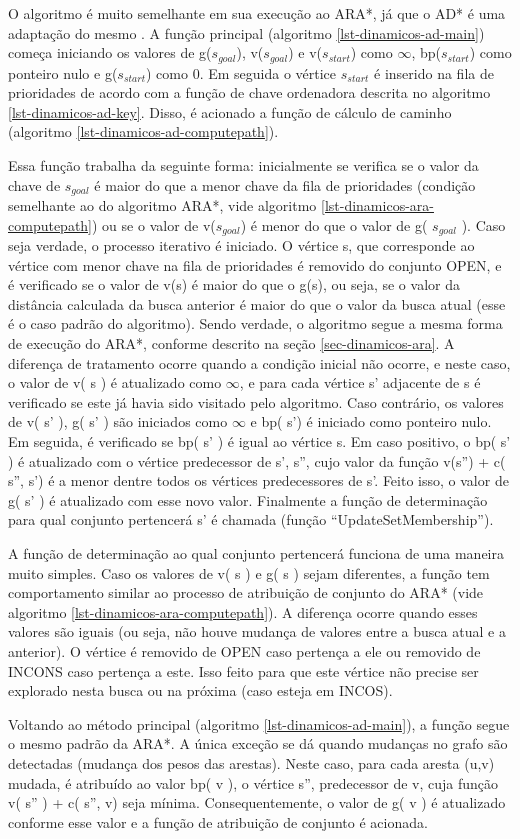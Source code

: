O algoritmo é muito semelhante em sua execução ao ARA*, já que o AD* é uma adaptação do mesmo \cite{moura2010estudo}. A função principal (algoritmo \ref{lst-dinamicos-ad-main}) começa iniciando os valores de g($s_{goal}$), v($s_{goal}$) e v($s_{start}$) como $\infty$, bp($s_{start}$) como ponteiro nulo e g($s_{start}$) como 0. Em seguida o vértice $s_{start}$ é inserido na fila de prioridades de acordo com  a função de chave ordenadora descrita no algoritmo \ref{lst-dinamicos-ad-key}. Disso, é acionado a função de cálculo de caminho (algoritmo \ref{lst-dinamicos-ad-computepath}).

Essa função trabalha da seguinte forma: inicialmente se verifica se o valor da chave de $s_{goal}$ é maior do que a menor chave da fila de prioridades (condição semelhante ao do algoritmo ARA*, vide algoritmo \ref{lst-dinamicos-ara-computepath}) ou se o valor de v($s_{goal}$) é menor do que o valor de g( $s_{goal}$ ). Caso seja verdade, o processo iterativo é iniciado. O vértice s, que corresponde ao vértice com menor chave na fila de prioridades é removido do conjunto OPEN, e é verificado se o valor de v(s) é maior do que o g(s), ou seja, se o valor da distância calculada da busca anterior é maior do que o valor da busca atual (esse é o caso padrão do algoritmo). Sendo verdade, o algoritmo segue a mesma forma de execução do ARA*, conforme descrito na seção \ref{sec-dinamicos-ara}. A diferença de tratamento ocorre quando a condição inicial não ocorre, e neste caso, o valor de v( s ) é atualizado como $\infty$, e para cada vértice s' adjacente de s é verificado se este já havia sido visitado pelo algoritmo. Caso contrário, os valores de v( s' ), g( s' ) são iniciados como $\infty$ e bp( s') é iniciado como ponteiro nulo. Em seguida, é verificado se bp( s' ) é igual ao vértice s. Em caso positivo, o bp( s' ) é atualizado com o vértice predecessor de s', s'', cujo valor da função v(s'') + c( s'', s') é a menor dentre todos os vértices predecessores de s'. Feito isso, o valor de g( s' ) é atualizado com esse novo valor. Finalmente a função de determinação para qual conjunto pertencerá s' é chamada (função ``UpdateSetMembership'').

A função de determinação ao qual conjunto pertencerá funciona de uma maneira muito simples. Caso os valores de v( s ) e g( s ) sejam diferentes, a função tem comportamento similar ao processo de atribuição de conjunto do ARA* (vide algoritmo \ref{lst-dinamicos-ara-computepath}). A diferença ocorre quando esses valores são iguais (ou seja, não houve mudança de valores entre a busca atual e a anterior). O vértice é removido de OPEN caso pertença a ele ou removido de INCONS caso pertença a este. Isso feito para que este vértice não precise ser explorado nesta busca ou na próxima (caso esteja em INCOS).

Voltando ao método principal (algoritmo \ref{lst-dinamicos-ad-main}), a função segue o mesmo padrão da ARA*. A única exceção se dá quando mudanças no grafo são detectadas (mudança dos pesos das arestas). Neste caso, para cada aresta (u,v) mudada, é atribuído ao valor bp( v ), o vértice s'', predecessor de v, cuja função v( s'' ) + c( s'', v) seja mínima. Consequentemente, o valor de g( v ) é atualizado conforme esse valor e a função de atribuição de conjunto é acionada. 